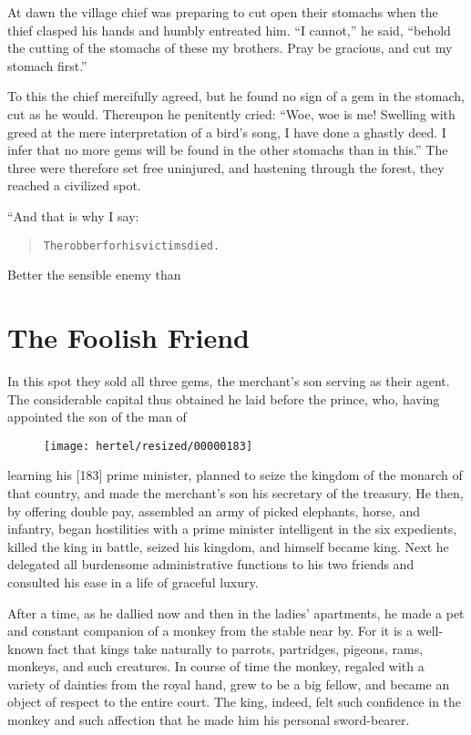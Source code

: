 \documentclass[article, twoside, 10pt]{memoir}
\renewenvironment{verbatim}{%
\begin{quote}%
\vskip -10pt%
\begin{alltt}\normalfont\small}{\end{alltt}%
\end{quote}%
\vskip -10pt
} %
\begin{document}
At dawn the village chief was preparing to cut open their stomachs
when the thief clasped his hands and humbly entreated him.
``I cannot,'' he said,
``behold the cutting of the stomachs of these my brothers. Pray be gracious, and cut my stomach first.''

To this the chief mercifully agreed, but he found no sign of a gem
in the stomach, cut as he would. Thereupon he penitently cried:
``Woe, woe is me! Swelling with greed at the mere interpretation of a bird's song, I have done a ghastly deed. I infer that no more gems will be found in the other stomachs than in this.''
The three were therefore set free uninjured, and hastening through
the forest, they reached a civilized spot.

“And that is why I say:

\begin{verbatim}
The robber for his victims died.
\end{verbatim}
Better the sensible enemy than

\chapter{The Foolish Friend}

In this spot they sold all three gems, the merchant's son serving
as their agent. The considerable capital thus obtained he laid
before the prince, who, having appointed the son of the man of
\begin{figure}[p]\texttt{[image: hertel/resized/00000183]}\end{figure}learning his [183] prime minister, planned to seize the kingdom of
the monarch of that country, and made the merchant's son his
secretary of the treasury. He then, by offering double pay,
assembled an army of picked elephants, horse, and infantry, began
hostilities with a prime minister intelligent in the six
expedients, killed the king in battle, seized his kingdom, and
himself became king. Next he delegated all burdensome
administrative functions to his two friends and consulted his ease
in a life of graceful luxury.

After a time, as he dallied now and then in the ladies' apartments,
he made a pet and constant companion of a monkey from the stable
near by. For it is a well-known fact that kings take naturally to
parrots, partridges, pigeons, rams, monkeys, and such creatures. In
course of time the monkey, regaled with a variety of dainties from
the royal hand, grew to be a big fellow, and became an object of
respect to the entire court. The king, indeed, felt such confidence
in the monkey and such affection that he made him his personal
sword-bearer.
\end{document}
